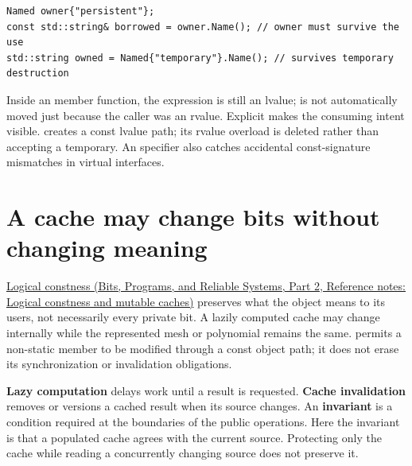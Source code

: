 \begin{verbatim}
Named owner{"persistent"};
const std::string& borrowed = owner.Name(); // owner must survive the use
std::string owned = Named{"temporary"}.Name(); // survives temporary destruction
\end{verbatim}

Inside an \BookInlineCode{{\&}{\&}}{\&\&} member function, the expression  is still an lvalue;  is not automatically moved just because the caller was an rvalue. Explicit  makes the consuming intent visible.  creates a const lvalue path; its rvalue overload is deleted rather than accepting a temporary. An  specifier also catches accidental const-signature mismatches in virtual interfaces.

\section{A cache may change bits without changing meaning}\label{05-engine-i-ch003-a-cache-may-change-bits-without-changing-meaning}

\hypertarget{05-engine-i-ch003-a-cache-may-change-bits-without-changing-meaning}{}

\href{../01-Bits-Programs-and-Reliable-Systems-P02/main.pdf\#nameddest=appendix-f5593256bcaf}{Logical constness (Bits, Programs, and Reliable Systems, Part 2, Reference notes: Logical constness and mutable caches)} preserves what the object means to its users, not necessarily every private bit. A lazily computed cache may change internally while the represented mesh or polynomial remains the same.  permits a non-static member to be modified through a const object path; it does not erase its synchronization or invalidation obligations.

\textbf{Lazy computation} delays work until a result is requested. \textbf{Cache invalidation} removes or versions a cached result when its source changes. An \textbf{invariant} is a condition required at the boundaries of the public operations. Here the invariant is that a populated cache agrees with the current source. Protecting only the cache while reading a concurrently changing source does not preserve it.

